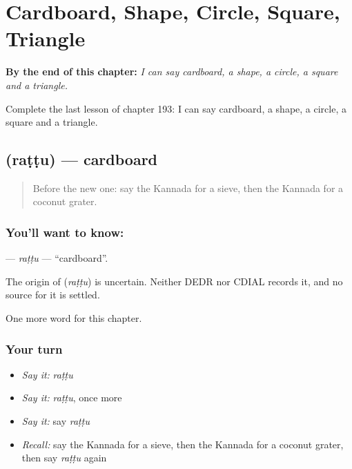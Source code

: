 
\chapter{Cardboard, Shape, Circle, Square, Triangle}
\label{ch:ka-cardboard-shape-circle-square-triangle}

\begin{chapteropening}
\textbf{By the end of this chapter:} \emph{I can say cardboard, a shape, a circle, a square and a triangle.}

Complete the last lesson of chapter 193: I can say cardboard, a shape, a circle, a square and a triangle.
\end{chapteropening}

\section[\texorpdfstring{\kn{ರಟ್ಟು} (raṭṭu)}{ರಟ್ಟು (raṭṭu)}]{ (raṭṭu) — cardboard}

\label{lesson:KA-C193-rattu}



\begin{quote}
Before the new one: say the Kannada for a sieve, then the Kannada for a coconut grater.
\end{quote}

\subsection*{You'll want to know: }
\textbf{} — \emph{raṭṭu} — \textquotedblleft{}cardboard\textquotedblright{}.

\begin{cousinweb}
The origin of \textbf{} (\emph{raṭṭu}) is uncertain. Neither DEDR nor CDIAL records it, and no source for it is settled.
\end{cousinweb}

\begin{grammarlens}[title={What you've built}]
One more word for this chapter.
\end{grammarlens}

\subsection*{Your turn}
\begin{itemize}
\raggedright
  \item \emph{Say it:} \emph{raṭṭu}
  \item \emph{Say it:} \emph{raṭṭu}, once more
  \item \emph{Say it:} say \emph{raṭṭu}
  \item \emph{Recall:} say the Kannada for a sieve, then the Kannada for a coconut grater, then say \emph{raṭṭu} again
\end{itemize}

